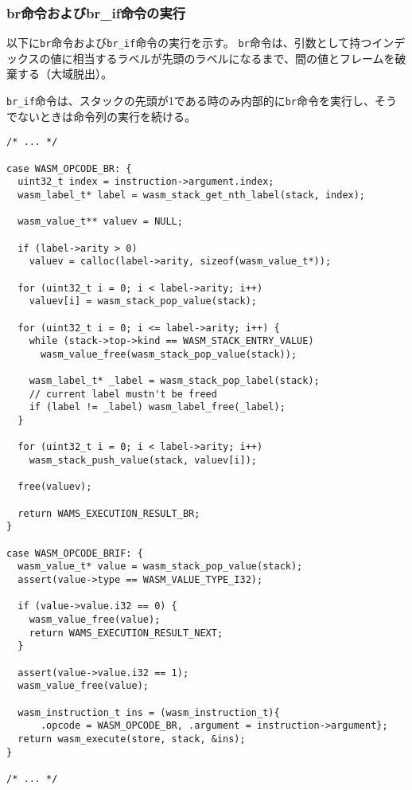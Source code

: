 \subsubsection{br命令およびbr\_if命令の実行}

以下に\verb|br|命令および\verb|br_if|命令の実行を示す。
\verb|br|命令は、引数として持つインデックスの値に相当するラベルが先頭のラベルになるまで、間の値とフレームを破棄する（大域脱出）。

\verb|br_if|命令は、スタックの先頭が1である時のみ内部的に\verb|br|命令を実行し、そうでないときは命令列の実行を続ける。

\begin{lstlisting}[caption=命令の実装,label=lst:parse_sleb128]
/* ... */

case WASM_OPCODE_BR: {
  uint32_t index = instruction->argument.index;
  wasm_label_t* label = wasm_stack_get_nth_label(stack, index);

  wasm_value_t** valuev = NULL;

  if (label->arity > 0)
    valuev = calloc(label->arity, sizeof(wasm_value_t*));

  for (uint32_t i = 0; i < label->arity; i++)
    valuev[i] = wasm_stack_pop_value(stack);

  for (uint32_t i = 0; i <= label->arity; i++) {
    while (stack->top->kind == WASM_STACK_ENTRY_VALUE)
      wasm_value_free(wasm_stack_pop_value(stack));

    wasm_label_t* _label = wasm_stack_pop_label(stack);
    // current label mustn't be freed
    if (label != _label) wasm_label_free(_label);
  }

  for (uint32_t i = 0; i < label->arity; i++)
    wasm_stack_push_value(stack, valuev[i]);

  free(valuev);

  return WAMS_EXECUTION_RESULT_BR;
}

case WASM_OPCODE_BRIF: {
  wasm_value_t* value = wasm_stack_pop_value(stack);
  assert(value->type == WASM_VALUE_TYPE_I32);

  if (value->value.i32 == 0) {
    wasm_value_free(value);
    return WAMS_EXECUTION_RESULT_NEXT;
  }

  assert(value->value.i32 == 1);
  wasm_value_free(value);

  wasm_instruction_t ins = (wasm_instruction_t){
      .opcode = WASM_OPCODE_BR, .argument = instruction->argument};
  return wasm_execute(store, stack, &ins);
}

/* ... */
\end{lstlisting}

